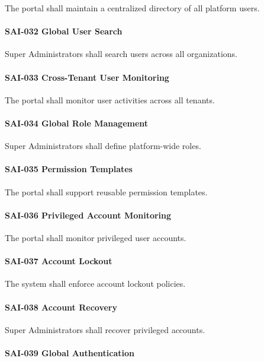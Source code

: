 The portal shall maintain a centralized directory of all platform users.

\paragraph{SAI-032 Global User Search}

Super Administrators shall search users across all organizations.

\paragraph{SAI-033 Cross-Tenant User Monitoring}

The portal shall monitor user activities across all tenants.

\paragraph{SAI-034 Global Role Management}

Super Administrators shall define platform-wide roles.

\paragraph{SAI-035 Permission Templates}

The portal shall support reusable permission templates.

\paragraph{SAI-036 Privileged Account Monitoring}

The portal shall monitor privileged user accounts.

\paragraph{SAI-037 Account Lockout}

The system shall enforce account lockout policies.

\paragraph{SAI-038 Account Recovery}

Super Administrators shall recover privileged accounts.

\paragraph{SAI-039 Global Authentication}

